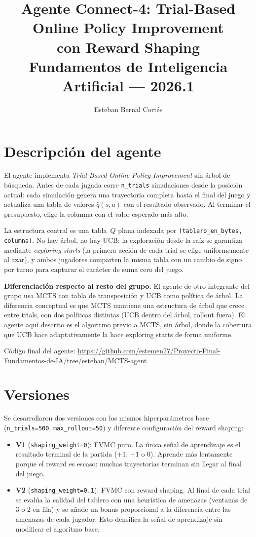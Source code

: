 \documentclass[11pt, a4paper]{article}
\title{\textbf{Agente Connect-4: Trial-Based Online Policy Improvement\\con Reward Shaping}\\[0.4em]
\large Fundamentos de Inteligencia Artificial --- 2026.1}
\author{Esteban Bernal Cortés}
\date{}
\begin{document}
\maketitle
\vspace{-1.2em}

\section*{Descripción del agente}

El agente implementa \textit{Trial-Based Online Policy Improvement} sin árbol de búsqueda. Antes de cada jugada corre \texttt{n\_trials} simulaciones desde la posición actual: cada simulación genera una trayectoria completa hasta el final del juego y actualiza una tabla de valores $\hat{q}(s, a)$ con el resultado observado. Al terminar el presupuesto, elige la columna con el valor esperado más alto.

La estructura central es una tabla~$Q$ plana indexada por \texttt{(tablero\_en\_bytes, columna)}. No hay árbol, no hay UCB: la exploración desde la raíz se garantiza mediante \textit{exploring starts} (la primera acción de cada trial se elige uniformemente al azar), y ambos jugadores comparten la misma tabla con un cambio de signo por turno para capturar el carácter de suma cero del juego.

\textbf{Diferenciación respecto al resto del grupo.} El agente de otro integrante del grupo usa MCTS con tabla de transposición y UCB como política de árbol. La diferencia conceptual es que MCTS mantiene una estructura de árbol que crece entre trials, con dos políticas distintas (UCB dentro del árbol, rollout fuera). El agente aquí descrito es el algoritmo previo a MCTS, sin árbol, donde la cobertura que UCB hace adaptativamente la hace exploring starts de forma uniforme.

Código final del agente:
\url{https://github.com/estemen27/Proyecto-Final-Fundamentos-de-IA/tree/esteban/MCTS-agent}

\section*{Versiones}

Se desarrollaron dos versiones con los mismos hiperparámetros base (\texttt{n\_trials=500}, \texttt{max\_rollout=50}) y diferente configuración del reward shaping:

\begin{itemize}
    \item \textbf{V1} (\texttt{shaping\_weight=0}): FVMC puro. La única señal de aprendizaje es el resultado terminal de la partida ($+1$, $-1$ o $0$). Aprende más lentamente porque el reward es escaso: muchas trayectorias terminan sin llegar al final del juego.

    \item \textbf{V2} (\texttt{shaping\_weight=0.1}): FVMC con reward shaping. Al final de cada trial se evalúa la calidad del tablero con una heurística de amenazas (ventanas de 3 o 2 en fila) y se añade un bonus proporcional a la diferencia entre las amenazas de cada jugador. Esto densifica la señal de aprendizaje sin modificar el algoritmo base.
\end{itemize}
\end{document}
